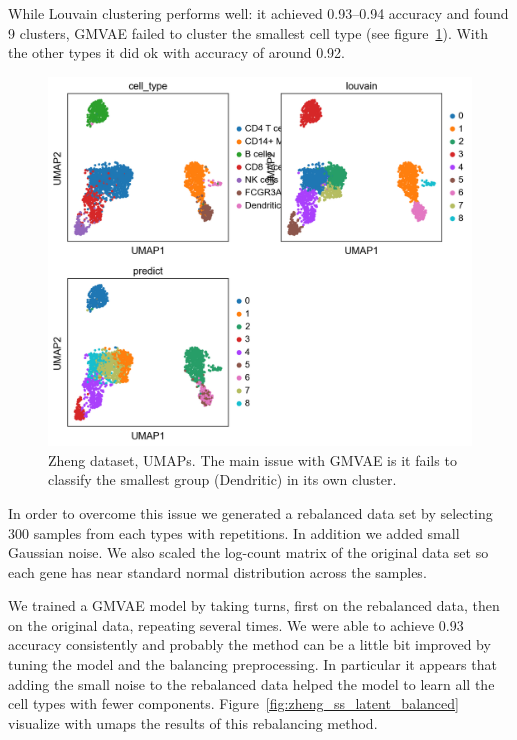 \documentclass[11pt, a4paper]{report}
\theoremstyle{plain}
\theoremstyle{definition}
\theoremstyle{remark}
\begin{document}
While Louvain clustering performs well: it achieved 0.93--0.94 accuracy and found 9
clusters, GMVAE failed to cluster the smallest cell type (see
figure~\ref{fig:zheng_ss_latent}). With the other types
it did ok with accuracy of around 0.92.

\begin{figure}[h]
\centering
\includegraphics[width=1.1\textwidth]{images/gmmvae_zheng_us_9c_umap.png}
\caption{Zheng dataset, UMAPs. The main issue with GMVAE is it fails to 
classify the smallest group (Dendritic) in its own cluster.}
\label{fig:zheng_ss_latent}
\end{figure}

In order to overcome this issue we generated a rebalanced data set by selecting 
$300$ samples from each types with repetitions. In addition we added small
Gaussian noise. We also scaled the log-count matrix of the original data set 
so each gene has near standard normal distribution across the samples.

We trained a GMVAE model by taking turns, first on the rebalanced data, then on
the original data, repeating several times.
We were able to achieve 0.93 accuracy consistently and probably the method can
be a little bit improved by tuning the model and the balancing preprocessing.
In particular it appears that adding the small noise to the rebalanced data
helped the model to learn all the cell types with fewer components.
Figure~\ref{fig:zheng_ss_latent_balanced} visualize with umaps the results 
of this rebalancing method.
\end{document}
